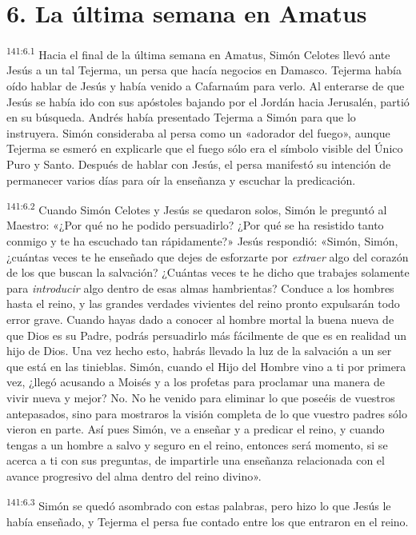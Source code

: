 \section*{6. La última semana en Amatus}
\par 
\textsuperscript{141:6.1} Hacia el final de la última semana en Amatus, Simón Celotes llevó ante Jesús a un tal Tejerma, un persa que hacía negocios en Damasco. Tejerma había oído hablar de Jesús y había venido a Cafarnaúm para verlo. Al enterarse de que Jesús se había ido con sus apóstoles bajando por el Jordán hacia Jerusalén, partió en su búsqueda. Andrés había presentado Tejerma a Simón para que lo instruyera. Simón consideraba al persa como un «adorador del fuego», aunque Tejerma se esmeró en explicarle que el fuego sólo era el símbolo visible del Único Puro y Santo. Después de hablar con Jesús, el persa manifestó su intención de permanecer varios días para oír la enseñanza y escuchar la predicación.

\par 
\textsuperscript{141:6.2} Cuando Simón Celotes y Jesús se quedaron solos, Simón le preguntó al Maestro: «¿Por qué no he podido persuadirlo? ¿Por qué se ha resistido tanto conmigo y te ha escuchado tan rápidamente?» Jesús respondió: «Simón, Simón, ¿cuántas veces te he enseñado que dejes de esforzarte por \textit{extraer} algo del corazón de los que buscan la salvación? ¿Cuántas veces te he dicho que trabajes solamente para \textit{introducir} algo dentro de esas almas hambrientas? Conduce a los hombres hasta el reino, y las grandes verdades vivientes del reino pronto expulsarán todo error grave. Cuando hayas dado a conocer al hombre mortal la buena nueva de que Dios es su Padre, podrás persuadirlo más fácilmente de que es en realidad un hijo de Dios. Una vez hecho esto, habrás llevado la luz de la salvación a un ser que está en las tinieblas. Simón, cuando el Hijo del Hombre vino a ti por primera vez, ¿llegó acusando a Moisés y a los profetas para proclamar una manera de vivir nueva y mejor? No. No he venido para eliminar lo que poseéis de vuestros antepasados, sino para mostraros la visión completa de lo que vuestro padres sólo vieron en parte. Así pues Simón, ve a enseñar y a predicar el reino, y cuando tengas a un hombre a salvo y seguro en el reino, entonces será momento, si se acerca a ti con sus preguntas, de impartirle una enseñanza relacionada con el avance progresivo del alma dentro del reino divino».

\par 
\textsuperscript{141:6.3} Simón se quedó asombrado con estas palabras, pero hizo lo que Jesús le había enseñado, y Tejerma el persa fue contado entre los que entraron en el reino.

